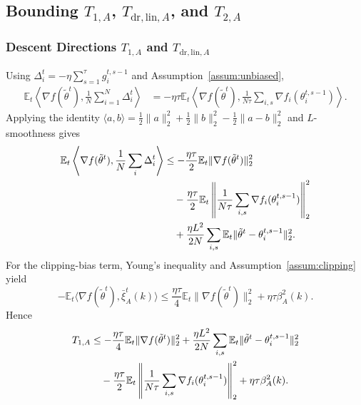 \documentclass[journal]{IEEEtran}
\begin{document}
\subsection{Bounding $T_{1,A}$, $T_{\mathrm{dr,lin},A}$, and $T_{2,A}$}

\subsubsection{Descent Directions $T_{1,A}$ and $T_{\mathrm{dr,lin},A}$}

Using $\Delta_i^t=-\eta\sum_{s=1}^{\tau}g_i^{t,s-1}$ and Assumption~\ref{assum:unbiased},
\begin{align}
    \mathbb{E}_t\left\langle\nabla f(\tilde\theta^t),\frac1N\sum_{i=1}^{N}\Delta_i^t\right\rangle
    &=-\eta\tau\mathbb{E}_t\left\langle\nabla f(\tilde\theta^t),
    \frac{1}{N\tau}\sum_{i,s}\nabla f_i(\theta_i^{t,s-1})\right\rangle.
\end{align}
Applying the identity $\langle a,b\rangle=\frac12\|a\|_2^2+\frac12\|b\|_2^2-\frac12\|a-b\|_2^2$ and $L$-smoothness gives
\begin{align}
    \mathbb{E}_t\left\langle\nabla f(\tilde\theta^t),\frac1N\sum_i\Delta_i^t\right\rangle
    &\le
    -\frac{\eta\tau}{2}\mathbb{E}_t\|\nabla f(\tilde\theta^t)\|_2^2
    \notag\\
    &\quad-
    \frac{\eta\tau}{2}\mathbb{E}_t\left\|\frac{1}{N\tau}\sum_{i,s}\nabla f_i(\theta_i^{t,s-1})\right\|_2^2
    \notag\\
    &\quad+
    \frac{\eta L^2}{2N}\sum_{i,s}\mathbb{E}_t\|\tilde\theta^t-\theta_i^{t,s-1}\|_2^2.
\end{align}
For the clipping-bias term, Young's inequality and Assumption~\ref{assum:clipping} yield
\begin{equation}
    -\mathbb{E}_t\langle\nabla f(\tilde\theta^t),\bar\xi_A^t(k)\rangle
    \le
    \frac{\eta\tau}{4}\mathbb{E}_t\|\nabla f(\tilde\theta^t)\|_2^2+
    \eta\tau\beta_A^2(k).
\end{equation}
Hence
\begin{align}
    \label{eqn:t1_bound_new}
    T_{1,A}
    &\le
    -\frac{\eta\tau}{4}\mathbb{E}_t\|\nabla f(\tilde\theta^t)\|_2^2
    +\frac{\eta L^2}{2N}\sum_{i,s}\mathbb{E}_t\|\tilde\theta^t-\theta_i^{t,s-1}\|_2^2
    \notag\\
    &\quad-
    \frac{\eta\tau}{2}\mathbb{E}_t\left\|\frac{1}{N\tau}\sum_{i,s}\nabla f_i(\theta_i^{t,s-1})\right\|_2^2
    +\eta\tau\beta_A^2(k).
\end{align}
\end{document}
